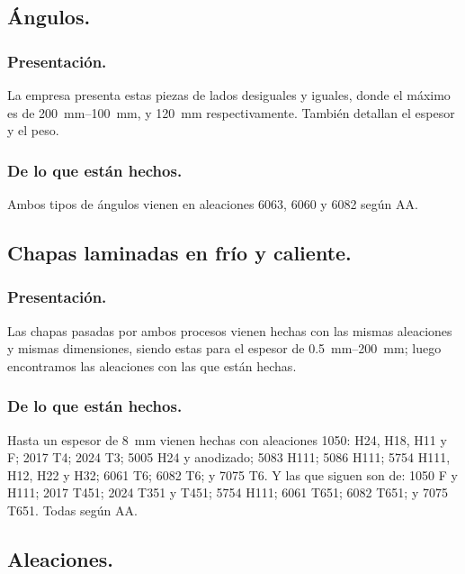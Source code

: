 \documentclass[12pt,a4paper]{article}
\begin{document}
\subsection{Ángulos.}

\subsubsection{Presentación.}

La empresa presenta estas piezas de lados desiguales y iguales, donde el máximo es de \SIrange[range-phrase = { y }, range-units=single]{200}{100}{\milli\metre}, y \SI{120}{\milli\metre} respectivamente. También detallan el espesor y el peso.

\subsubsection{De lo que están hechos.}

Ambos tipos de ángulos vienen en aleaciones 6063, 6060 y 6082 según AA.

\subsection{Chapas laminadas en frío y caliente.}

\subsubsection{Presentación.}

Las chapas pasadas por ambos procesos vienen hechas con las mismas aleaciones y mismas dimensiones, siendo estas para el espesor de \SIrange[range-phrase = { a }, range-units=single]{0,5}{200}{\milli\metre}; luego encontramos las aleaciones con las que están hechas.

\subsubsection{De lo que están hechos.}

Hasta un espesor de \SI{8}{\milli\metre} vienen hechas con aleaciones 1050: H24, H18, H11 y F; 2017 T4; 2024 T3; 5005 H24 y anodizado; 5083 H111; 5086 H111; 5754 H111, H12, H22 y H32; 6061 T6; 6082 T6; y 7075 T6. Y las que siguen son de: 1050 F y H111; 2017 T451; 2024 T351 y T451; 5754 H111; 6061 T651; 6082 T651; y 7075 T651. Todas según AA.

\subsection{Aleaciones.}
\end{document}
